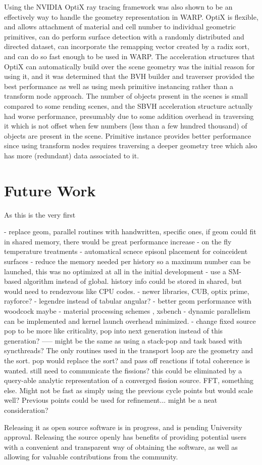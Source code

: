 Using the NVIDIA OptiX ray tracing framework was also shown to be an effectively way to handle the geometry representation in WARP.  OptiX is flexible, and allows attachment of material and cell number to individual geometric primitives, can do perform surface detection with a randomly distributed and directed dataset, can incorporate the remapping vector created by a radix sort, and can do so fast enough to be used in WARP.  The acceleration structures that OptiX can automatically build over the scene geometry was the initial reason for using it, and it was determined that the BVH builder and traverser provided the best performance as well as using mesh primitive instancing rather than a transform node approach.  The number of objects present in the scenes is small compared to some rending scenes, and the SBVH acceleration structure actually had worse performance, presumably due to some addition overhead in traversing it which is not offset when few numbers (less than a few hundred thousand) of objects are present in the scene.  Primitive instance provides better performance since using transform nodes requires traversing a deeper geometry tree which also has more (redundant) data associated to it.

\section{Future Work}

As this is the very first 

- replace geom, parallel routines with handwritten, specific ones, if geom could fit in shared memory, there would be great performance increase
- on the fly temperature treatments
- automatical scnece episonl placement for coinceident surfaces
- reduce the memory needed per history so a maximum number can be launched, this was no optimized at all in the initial development
- use a SM-based algorithm instead of global.  history info could be stored in shared, but would need to rendezvous like CPU codes.
- newer libraries, CUB, optix prime, rayforce?
- legendre instead of tabular angular?
- better geom performance with woodcock maybe
- material processing schemes , xsbench \cite{openmc}
- dynamic parallelism can be implemented and kernel launch overhead minimized.  
- change fixed source pop to be more like criticality, pop into next generation instead of this generation?
-----  might be the same as using a stack-pop and task based with syncthreads?  The only routines used in the transport loop are the geometry and the sort.   pop would replace the sort?  and pass off reactions if total coherence is wanted.  still need to communicate the fissions?  this could be eliminated by a query-able analytic representation of a converged fission source.  FFT, something else.  Might not be fast as simply using the previous cycle points but would scale well?  Previous points could be used for refinement...  might be a neat consideration?

Releasing it as open source software is in progress, and is pending University approval.  Releasing the source openly has benefits of providing potential users with a convenient and transparent way of obtaining the software, as well as allowing for valuable contributions from the community.